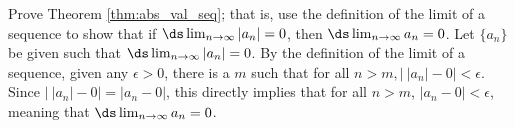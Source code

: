 {Prove Theorem \ref{thm:abs_val_seq}; that is, 
		use the definition of the limit of a sequence to show that if $\ds\lim_{n\to\infty} |a_n| = 0$, then $\ds \lim_{n\to\infty} a_n = 0$.
}
{Let $\{a_n\}$ be given such that $\ds\lim_{n\to\infty} |a_n| = 0$. By the definition of the limit of a sequence, given any $\epsilon >0$, there is a $m$ such that for all $n>m, \big|\ |a_n| - 0\big| <\epsilon$. Since $\big|\ |a_n|-0\big| = |a_n - 0|$, this directly implies that for all $n>m$, $|a_n - 0| < \epsilon$, meaning that $\ds\lim_{n\to\infty} a_n = 0$.
}
